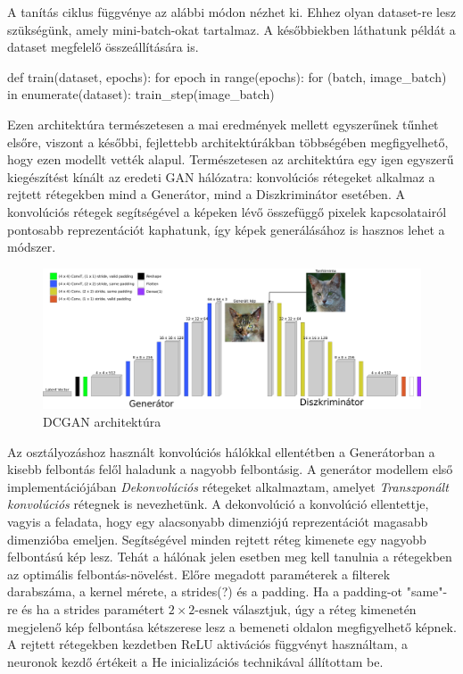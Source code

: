 A tanítás ciklus függvénye az alábbi módon nézhet ki. Ehhez olyan dataset-re lesz szükségünk, amely mini-batch-okat tartalmaz. A későbbiekben láthatunk példát a dataset megfelelő összeállítására is.
\begin{python}
def train(dataset, epochs):
    for epoch in range(epochs):
        for (batch, image_batch) in enumerate(dataset):
            train_step(image_batch)
\end{python}


Ezen architektúra természetesen a mai eredmények mellett egyszerűnek tűnhet elsőre, viszont a későbbi, fejlettebb architektúrákban többségében megfigyelhető, hogy ezen modellt vették alapul. Természetesen az architektúra egy igen egyszerű kiegészítést kínált az eredeti GAN hálózatra: konvolúciós rétegeket alkalmaz a rejtett rétegekben mind a Generátor, mind a Diszkriminátor esetében. A konvolúciós rétegek segítségével a képeken lévő összefüggő pixelek kapcsolatairól pontosabb reprezentációt kaphatunk, így képek generálásához is hasznos lehet a módszer.

\begin{figure}[h]
\centering
\includegraphics[width=15cm]{images/DCGAN.png}
\caption{DCGAN architektúra}
\label{fig:dcgan}
\end{figure}


Az osztályozáshoz használt konvolúciós hálókkal ellentétben a Generátorban a kisebb felbontás felől haladunk a nagyobb felbontásig.
A generátor modellem első implementációjában \textit{Dekonvolúciós} rétegeket alkalmaztam, amelyet \textit{Transzponált konvolúciós} rétegnek is nevezhetünk. A dekonvolúció a konvolúció ellentettje, vagyis a feladata, hogy egy alacsonyabb dimenziójú reprezentációt magasabb dimenzióba emeljen. Segítségével minden rejtett réteg kimenete egy nagyobb felbontású kép lesz. Tehát a hálónak jelen esetben meg kell tanulnia a rétegekben az optimális felbontás-növelést. Előre megadott paraméterek a filterek darabszáma, a kernel mérete, a strides(?) és a padding. Ha a padding-ot "same"-re és ha a strides paramétert $2 \times 2$-esnek választjuk, úgy a réteg kimenetén megjelenő kép felbontása kétszerese lesz a bemeneti oldalon megfigyelhető képnek. A rejtett rétegekben kezdetben ReLU aktivációs függvényt használtam, a neuronok kezdő értékeit a He inicializációs technikával \cite{he2015delving} állítottam be.

